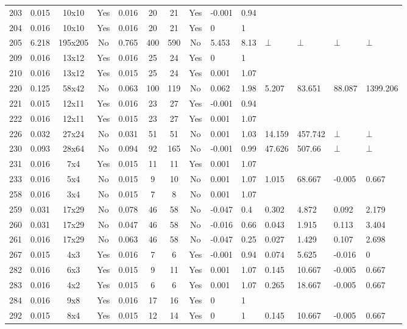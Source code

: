 \documentclass[11pt]{article}
\begin{document}
\begin{landscape}
\begin{small}
\begin{longtable}[c]{| c | c | c | c |c |c |c |c |p{1.5cm} |p{1.5cm} |p{1.5cm} |p{1.5cm} |p{1.5cm} |p{1.5cm} |}
203 & 0.015 & 10x10 & Yes & 0.016 & 20 & 21 & Yes & -0.001 & 0.94 &  &  &  & \\
204 & 0.016 & 10x10 & Yes & 0.016 & 20 & 21 & Yes & 0 & 1 &  &  &  & \\
205 & 6.218 & 195x205 & No & 0.765 & 400 & 590 & No & 5.453 & 8.13 & $\bot$ & $\bot$ & $\bot$ & $\bot$\\
209 & 0.016 & 13x12 & Yes & 0.016 & 25 & 24 & Yes & 0 & 1 &  &  &  & \\
210 & 0.016 & 13x12 & Yes & 0.015 & 25 & 24 & Yes & 0.001 & 1.07 &  &  &  & \\
220 & 0.125 & 58x42 & No & 0.063 & 100 & 119 & No & 0.062 & 1.98 & 5.207 & 83.651 & 88.087 & 1399.206\\
221 & 0.015 & 12x11 & Yes & 0.016 & 23 & 27 & Yes & -0.001 & 0.94 &  &  &  & \\
222 & 0.016 & 12x11 & Yes & 0.015 & 23 & 27 & Yes & 0.001 & 1.07 &  &  &  & \\
226 & 0.032 & 27x24 & No & 0.031 & 51 & 51 & No & 0.001 & 1.03 & 14.159 & 457.742 & $\bot$ & $\bot$\\
230 & 0.093 & 28x64 & No & 0.094 & 92 & 165 & No & -0.001 & 0.99 & 47.626 & 507.66 & $\bot$ & $\bot$\\
231 & 0.016 & 7x4 & Yes & 0.015 & 11 & 11 & Yes & 0.001 & 1.07 &  &  &  & \\
233 & 0.016 & 5x4 & No & 0.015 & 9 & 10 & No & 0.001 & 1.07 & 1.015 & 68.667 & -0.005 & 0.667\\
258 & 0.016 & 3x4 & No & 0.015 & 7 & 8 & No & 0.001 & 1.07 &  &  &  & \\
259 & 0.031 & 17x29 & No & 0.078 & 46 & 58 & No & -0.047 & 0.4 & 0.302 & 4.872 & 0.092 & 2.179\\
260 & 0.031 & 17x29 & No & 0.047 & 46 & 58 & No & -0.016 & 0.66 & 0.043 & 1.915 & 0.113 & 3.404\\
261 & 0.016 & 17x29 & No & 0.063 & 46 & 58 & No & -0.047 & 0.25 & 0.027 & 1.429 & 0.107 & 2.698\\
267 & 0.015 & 4x3 & Yes & 0.016 & 7 & 6 & Yes & -0.001 & 0.94 & 0.074 & 5.625 & -0.016 & 0\\
282 & 0.016 & 6x3 & Yes & 0.015 & 9 & 11 & Yes & 0.001 & 1.07 & 0.145 & 10.667 & -0.005 & 0.667\\
283 & 0.016 & 4x2 & Yes & 0.015 & 6 & 6 & Yes & 0.001 & 1.07 & 0.265 & 18.667 & -0.005 & 0.667\\
284 & 0.016 & 9x8 & Yes & 0.016 & 17 & 16 & Yes & 0 & 1 &  &  &  & \\
292 & 0.015 & 8x4 & Yes & 0.015 & 12 & 14 & Yes & 0 & 1 & 0.145 & 10.667 & -0.005 & 0.667\\

\end{longtable}
\end{small}
\end{landscape}
\end{document}
